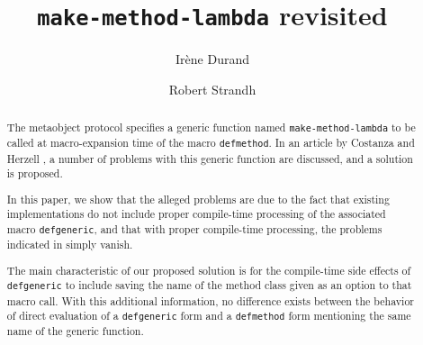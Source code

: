 \documentclass[format=sigconf]{acmart}
\begin{document}

\title{\texttt{make-method-lambda} revisited}

\author{Irène Durand}

\author{Robert Strandh}






\begin{abstract}
The \commonlisp{} metaobject protocol specifies a generic function
named \texttt{make-method-lambda} to be called at macro-expansion time
of the macro \texttt{defmethod}.  In an article by Costanza and
Herzell \cite{Constanza:2008}, a number of problems with this generic
function are discussed, and a solution is proposed.

In this paper, we show that the alleged problems are due to the fact
that existing implementations do not include proper compile-time
processing of the associated macro \texttt{defgeneric}, and that with
proper compile-time processing, the problems indicated in
\cite{Constanza:2008} simply vanish.

The main characteristic of our proposed solution is for the
compile-time side effects of \texttt{defgeneric} to include saving the
name of the method class given as an option to that macro call.  With
this additional information, no difference exists between the behavior
of direct evaluation of a \texttt{defgeneric} form and a
\texttt{defmethod} form mentioning the same name of the generic function.
\end{abstract}
\end{document}
